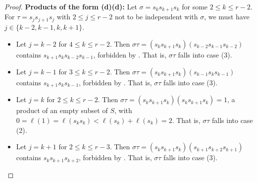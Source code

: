 \documentclass{amsart}
\theoremstyle{definition}
\begin{document}
\begin{appendices}
\begin{proof}
\noindent \textbf{Products of the form (d)(d):}
    Let $\sigma = s_ks_{k+1}s_k$ for some $2 \le k \le r-2$. For $\tau= s_js_{j+1}s_j$ with $2 \le j \le r-2$ not to be independent with $\sigma$, we must have $j\in\{k-2,k-1,k,k+1\}$.
    \begin{itemize}
        \item Let $j=k-2$ for $4\leq k\leq r-2$. Then $\sigma\tau=(s_ks_{k+1}s_k)(s_{k-2}s_{k-1}s_{k-2})$ contains $s_{k+1}s_ks_{k-2}s_{k-1}$, forbidden by . That is, $\sigma\tau$ falls into case (3).
        \item Let $j=k-1$ for $3\leq k\leq r-2$. Then $\sigma\tau=(s_ks_{k+1}s_k)(s_{k-1}s_ks_{k-1})$ contains $s_{k+1}s_ks_{k-1}$, forbidden by . That is, $\sigma\tau$ falls into case (3).
        \item Let $j=k$ for $2\leq k\leq r-2$. Then $\sigma\tau=(s_ks_{k+1}s_k)(s_ks_{k+1}s_k)=1$, a product of an empty subset of $S$, with $0=\ell(1)=\ell(s_ks_{k})<\ell(s_k)+\ell(s_{k})=2$. That is, $\sigma\tau$ falls into case (2).
        \item Let $j=k+1$ for $2\leq k\leq r-3$. Then  $\sigma\tau=(s_ks_{k+1}s_k)(s_{k+1}s_{k+2}s_{k+1})$ contains $s_ks_{k+1}s_{k+2}$, forbidden by . That is, $\sigma\tau$ falls into case (3).
    \end{itemize}
    \smallskip
    

\end{proof}
\end{appendices}
\end{document}
